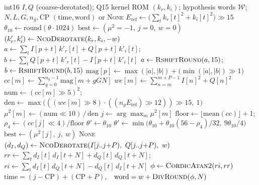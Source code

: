 \begin{algorithm}[H]
\caption{Integer ZC detector (fixed-point twin and C port).}
\label{lst:zc_int}
\begin{algorithmic}[1]
\Require int16 $I, Q$ (coarse-derotated); Q15 kernel ROM $(k_r, k_i)$; hypothesis words $\mathcal{W}$; $N, L, G, n_g, \mathrm{CP}$
\Ensure $(\text{time}, \text{word})$ or \textsc{None}
\State $E_{\mathrm{ref}} \gets \big(\sum_t k_r[t]^2 + k_i[t]^2\big) \gg 15$ 
\State $\theta_{10} \gets \mathrm{round}(\theta \cdot 1024)$ 
\State $\mathrm{best} \gets (\mu^2{=}-1,\ j{=}0,\ w{=}0)$
 
    \State $(k'_r, k'_i) \gets \textsc{NcoDerotate}(k_r, k_i, -w)$ 
     
        \State $a \gets \sum_t I[p{+}t]\,k'_r[t] + Q[p{+}t]\,k'_i[t]$;\quad $b \gets \sum_t Q[p{+}t]\,k'_r[t] - I[p{+}t]\,k'_i[t]$
        \State $a \gets \textsc{RshiftRound}(a, 15)$;\quad $b \gets \textsc{RshiftRound}(b, 15)$
        \State $\mathrm{mag}[p] \gets \max(|a|,|b|) + \big(\min(|a|,|b|) \gg 1\big)$ 
    \EndFor
    \State $cc[m] \gets \sum_{g=0}^{n_g-1} \mathrm{mag}[m + gGN]$
    \State $we[m] \gets \sum_{n=m}^{m+P-1} I[n]^2 + Q[n]^2$ 
    \State $\mathrm{num} \gets (cc[m] \gg 5)^2$;\quad $\mathrm{den} \gets \max\big(((we[m] \gg 8)\cdot((n_g E_{\mathrm{ref}}) \gg 12)) \gg 15,\ 1\big)$
    \State $\mu^2[m] \gets (\mathrm{num} \ll 10) \,/\, \mathrm{den}$ 
    \State $j \gets \arg\max_m \mu^2[m]$ 
    \State $\mathrm{floor} \gets \lfloor \mathrm{mean}(cc) \rfloor + 1$;\quad $\rho_4 \gets (cc[j] \ll 4) / \mathrm{floor}$ 
    \State $\theta' \gets \theta_{10}$
     $\theta' \gets \min\big(\theta_{10} + \theta_{10}(56 - \rho_4)/32,\ 9\theta_{10}/4\big)$  \EndIf
     $\mathrm{best} \gets (\mu^2[j],\ j,\ w)$ \EndIf
\EndFor
{} \Return \textsc{None} \EndIf
\State $(d_I, d_Q) \gets \textsc{NcoDerotate}(I[j..j{+}P),\ Q[j..j{+}P),\ w)$ 
\State $rr \gets \sum_t d_I[t]\,d_I[t{+}N] + d_Q[t]\,d_Q[t{+}N]$;\quad $ri \gets \sum_t d_I[t]\,d_Q[t{+}N] - d_Q[t]\,d_I[t{+}N]$
\State $\phi \gets \textsc{CordicAtan2}(ri, rr)$ 
\State \Return $\text{time} = (j - \mathrm{CP}) + (\mathrm{CP} + P)$,\ \ $\text{word} = w + \textsc{DivRound}(\phi, N)$
\end{algorithmic}
\end{algorithm}

